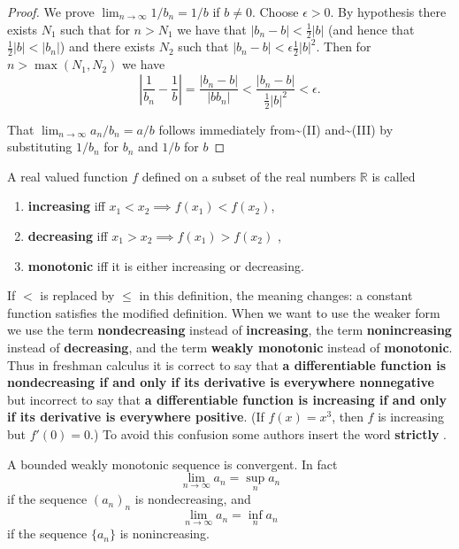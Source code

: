 \documentclass[10pt,a4paper,UTF8]{article}
\begin{document}
\begin{proof}
We prove \(\lim_{n\to\infty} 1/b_n = 1/b\) if \(b\ne 0\). Choose \(\epsilon > 0\). By hypothesis there exists \(N_1\) such that
 for \(n > N_1\) we have  that \(|b_n-b| < \tfrac12|b|\)  (and hence that \(\tfrac12|b| < |b_n|\)) and there exists \(N_2\) such that
 \(|b_n-b| <  \epsilon\tfrac12|b|^2\).
Then for \(n > \max(N_1,N_2)\) we have
\begin{equation*}
\left|\frac1{b_n}-\frac1{b}\right|=\frac{|b_n-b|}{|bb_n|} < \frac{|b_n-b|}{\tfrac12|b|^2} < \epsilon.
\end{equation*}


That \(\lim_{n\to\infty} a_n/b_n = a/b\) follows immediately from\textasciitilde{}(II) and\textasciitilde{}(III)
by substituting \(1/b_n\) for \(b_n\) and \(1/b\) for \(b\)
\end{proof}

\begin{definition}
 A real valued function \(f\) defined on a subset
of the real numbers \(\mathbb{R}\) is called

\begin{enumerate}
\item \textbf{increasing} iff \(x_1  <  x_2\implies f(x_1) <   f(x_2)\),
\item \textbf{decreasing} iff \(x_1  >  x_2\implies f(x_1) >  f(x_2)\) ,
\item \textbf{monotonic} iff  it is either  increasing or decreasing.
\end{enumerate}
\end{definition}

\begin{remark}
 If \(<\) is replaced by \(\le\) in this definition, the meaning
changes: a constant function satisfies the modified definition.
When we want to use the weaker form we use
the term \textbf{nondecreasing} instead of \textbf{increasing},
the term \textbf{nonincreasing} instead of \textbf{decreasing},
and
the term \textbf{weakly monotonic} instead of \textbf{monotonic}.
Thus in freshman calculus it is correct to say that
\textbf{a differentiable function is nondecreasing if and only if its derivative is everywhere nonnegative}
but incorrect to say that
\textbf{a differentiable function is increasing if and only if its derivative is everywhere positive}.
(If \(f(x)=x^3\), then \(f\) is increasing but \(f'(0)=0\).) To avoid this
confusion some authors insert the word \textbf{strictly} .
\end{remark}


\begin{theorem}
A bounded weakly monotonic sequence is convergent. In fact
\begin{equation*}
    \lim_{n\to\infty}a_n=\sup_n a_n
\end{equation*}
if the sequence \((a_n)_n\) is nondecreasing, and
\begin{equation*}
    \lim_{n\to\infty}a_n=\inf_n a_n
\end{equation*}
if the sequence \(\{a_n\}\) is nonincreasing.
\end{theorem}
\end{document}
